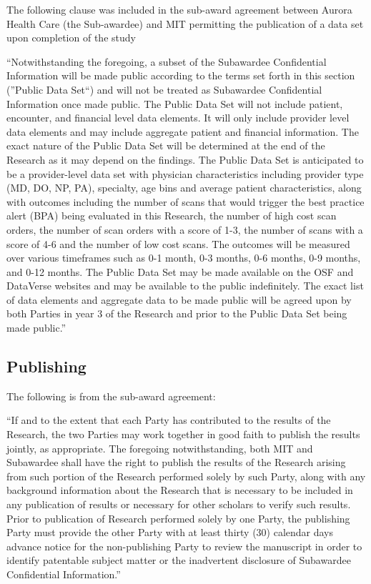 \documentclass[
]{book}
\begin{document}
The following clause was included in the sub-award agreement between Aurora Health Care (the Sub-awardee) and MIT permitting the publication of a data set upon completion of the study

``Notwithstanding the foregoing, a subset of the Subawardee Confidential Information will be made public according to the terms set forth in this section (''Public Data Set``) and will not be treated as Subawardee Confidential Information once made public. The Public Data Set will not include patient, encounter, and financial level data elements. It will only include provider level data elements and may include aggregate patient and financial information. The exact nature of the Public Data Set will be determined at the end of the Research as it may depend on the findings. The Public Data Set is anticipated to be a provider-level data set with physician characteristics including provider type (MD, DO, NP, PA), specialty, age bins and average patient characteristics, along with outcomes including the number of scans that would trigger the best practice alert (BPA) being evaluated in this Research, the number of high cost scan orders, the number of scan orders with a score of 1-3, the number of scans with a score of 4-6 and the number of low cost scans. The outcomes will be measured over various timeframes such as 0-1 month, 0-3 months, 0-6 months, 0-9 months, and 0-12 months. The Public Data Set may be made available on the OSF and DataVerse websites and may be available to the public indefinitely. The exact list of data elements and aggregate data to be made public will be agreed upon by both Parties in year 3 of the Research and prior to the Public Data Set being made public.''

\hypertarget{publishing}{%
\subsection*{Publishing}\label{publishing}}

The following is from the sub-award agreement:

``If and to the extent that each Party has contributed to the results of the Research, the two Parties may work together in good faith to publish the results jointly, as appropriate. The foregoing notwithstanding, both MIT and Subawardee shall have the right to publish the results of the Research arising from such portion of the Research performed solely by such Party, along with any background information about the Research that is necessary to be included in any publication of results or necessary for other scholars to verify such results. Prior to publication of Research performed solely by one Party, the publishing Party must provide the other Party with at least thirty (30) calendar days advance notice for the non-publishing Party to review the manuscript in order to identify patentable subject matter or the inadvertent disclosure of Subawardee Confidential Information.''
\end{document}
